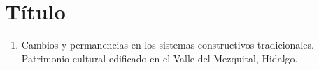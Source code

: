 \section{Título}







%
%

\begin{enumerate}[itemsep=0pt]

	\item Cambios y permanencias en los sistemas constructivos tradicionales. Patrimonio cultural edificado en el Valle del Mezquital, Hidalgo. 

\end{enumerate}

